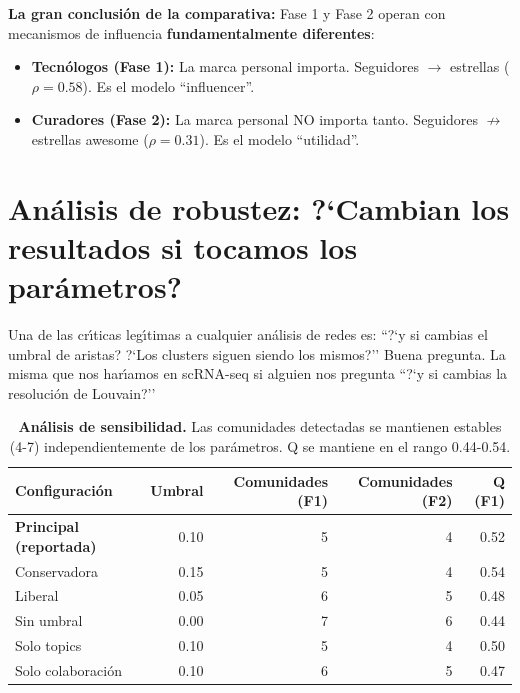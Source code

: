 \documentclass[11pt]{article}
\begin{document}
\textbf{La gran conclusi\'{o}n de la comparativa:} Fase 1 y Fase 2 operan con mecanismos de influencia \textbf{fundamentalmente diferentes}:

\begin{itemize}
    \item \textbf{Tecn\'{o}logos (Fase 1):} La marca personal importa. Seguidores $\rightarrow$ estrellas ($\rho = 0.58$). Es el modelo ``influencer''.
    \item \textbf{Curadores (Fase 2):} La marca personal NO importa tanto. Seguidores $\not\rightarrow$ estrellas awesome ($\rho = 0.31$). Es el modelo ``utilidad''.
\end{itemize}


\section{An\'{a}lisis de robustez: ?`Cambian los resultados si tocamos los par\'{a}metros?}

Una de las cr\'{\i}ticas leg\'{\i}timas a cualquier an\'{a}lisis de redes es: ``?`y si cambias el umbral de aristas? ?`Los clusters siguen siendo los mismos?'' Buena pregunta. La misma que nos har\'{\i}amos en scRNA-seq si alguien nos pregunta ``?`y si cambias la resoluci\'{o}n de Louvain?''

\begin{table}[H]
    \centering
    \begin{tabular}{lrrrr}
        \toprule
        \textbf{Configuraci\'{o}n} & \textbf{Umbral} & \textbf{Comunidades (F1)} & \textbf{Comunidades (F2)} & \textbf{Q (F1)} \\
        \midrule
        \textbf{Principal (reportada)} & 0.10 & 5 & 4 & 0.52 \\
        Conservadora & 0.15 & 5 & 4 & 0.54 \\
        Liberal & 0.05 & 6 & 5 & 0.48 \\
        Sin umbral & 0.00 & 7 & 6 & 0.44 \\
        \midrule
        Solo topics & 0.10 & 5 & 4 & 0.50 \\
        Solo colaboraci\'{o}n & 0.10 & 6 & 5 & 0.47 \\
        \bottomrule
    \end{tabular}
    \caption{\textbf{An\'{a}lisis de sensibilidad.} Las comunidades detectadas se mantienen estables (4-7) independientemente de los par\'{a}metros. Q se mantiene en el rango 0.44-0.54.}
\end{table}
\end{document}
